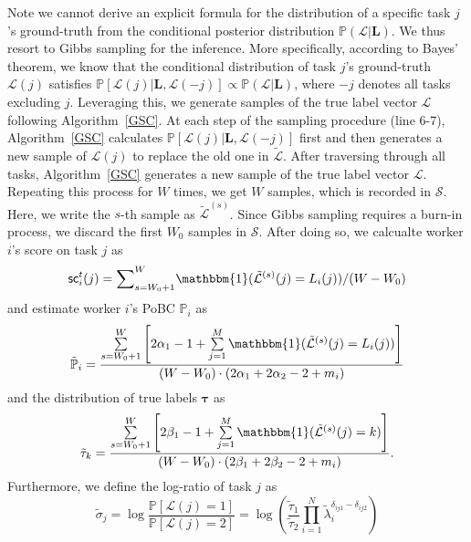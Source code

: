 Note we cannot derive an explicit formula for the distribution of a specific task $j$'s ground-truth from the conditional posterior distribution $\mathbb{P}(\mathcal{L}|\bm{L})$. We thus resort to Gibbs sampling for the inference.
More specifically, according to Bayes' theorem, we know that the conditional distribution of task $j$'s ground-truth $\mathcal{L}(j)$ satisfies
$\mathbb{P}[\mathcal{L}(j)|\bm{L}, \mathcal{L}(-j)]\propto \mathbb{P}(\mathcal{L}|\bm{L})$, where $-j$ denotes all tasks excluding $j$.
Leveraging this, we generate samples of the true label vector $\mathcal{L}$ following Algorithm~\ref{GSC}.
At each step of the sampling procedure (line 6-7), Algorithm~\ref{GSC} calculates $\mathbb{P}[\mathcal{L}(j)|\bm{L}, \mathcal{L}(-j)]$ first and then generates a new sample of $\mathcal{L}(j)$ to replace the old one in $\tilde{\mathcal{L}}$.
After traversing through all tasks, Algorithm~\ref{GSC} generates a new sample of the true label vector $\mathcal{L}$.
Repeating this process for $W$ times, we get $W$ samples, which is recorded in $\mathcal{S}$.
Here, we write the $s$-th sample as $\tilde{\mathcal{L}}^{(s)}$.
Since Gibbs sampling requires a burn-in process, we discard the first $W_0$ samples in $\mathcal{S}$. After doing so, we calcualte worker $i$'s score on task $j$ as
\begin{equation}
\label{equaton:score}
\textsf{sc}^{t}_i(j) = {\sum}_{s=W_0+1}^{W}\mathbbm{1}(\tilde{\mathcal{L}}^{(s)}(j)=L_{i}(j))/(W-W_0)
\end{equation}
and estimate worker $i$'s PoBC $\mathbb{P}_i$ as
\begin{equation}
\label{equation:p_infer}
\tilde{\mathbb{P}}_{i}=\frac{\sum\limits_{s=W_0+1}^{W}\left[2\alpha_{1}-1+\sum\limits_{j=1}^{M}\mathbbm{1}(\tilde{\mathcal{L}}^{(s)}(j)=L_{i}(j))\right]}{(W-W_0)\cdot(2\alpha_{1}+2\alpha_{2}-2+m_i)}
\end{equation}
and the distribution of true labels $\bm{\tau}$ as
\begin{equation}
\label{tau_infer}
\tilde{\tau}_{k}=\frac{\sum\limits_{s=W_0+1}^{W}\left[2\beta_{1}-1+\sum\limits_{j=1}^{M}\mathbbm{1}(\tilde{\mathcal{L}}^{(s)}(j)=k)\right]}{(W-W_0)\cdot(2\beta_{1}+2\beta_{2}-2+m_i)}.
\end{equation}
Furthermore, we define the log-ratio of task $j$ as
\begin{equation}
\label{ProbRatio}
\tilde{\sigma}_j=\log\frac{\mathbb{P}[\mathcal{L}(j)=1]}{\mathbb{P}[\mathcal{L}(j)=2]}=\log\left(\frac{\tilde{\tau}_1}{\tilde{\tau}_2}\prod_{i=1}^{N}\tilde{\lambda}_i^{\delta_{ij1}-\delta_{ij2}}\right)
\end{equation}
